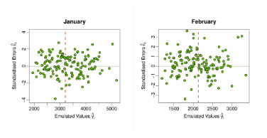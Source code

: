\documentclass[a4paper, 12pt]{article}
\begin{document}
\renewcommand{\scale}{12.7em}
\begin{figure}
\centering

 \includegraphics[width=\scale]{Validation_Plots/Evaluation_Set/Evaluation_Scatter_01_Jan}\hspace{-1ex}
 \includegraphics[width=\scale]{Validation_Plots/Evaluation_Set/Evaluation_Scatter_02_Feb}\hspace{-1ex}

\end{figure}
\end{document}
